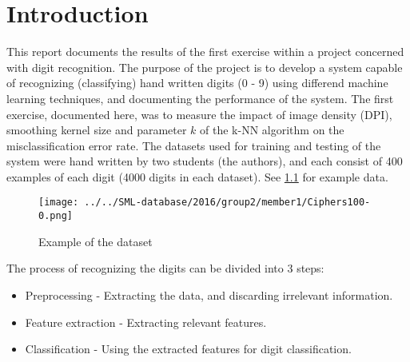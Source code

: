 \chapter{Introduction}
This report documents the results of the first exercise within
a project concerned with digit recognition.
The purpose of the project is to develop a system capable of recognizing
(classifying) hand written digits (0 - 9) using differend machine learning techniques,
and documenting the performance of the system.
The first exercise, documented here, was to measure the impact
of image density (DPI), smoothing kernel size and parameter \(k\)
of the k-NN algorithm on the misclassification error rate.
The datasets used for training and testing of the system
were hand written by two students (the authors), and each
consist of 400 examples of each digit (4000 digits in each dataset).
See \ref{fig:data} for example data.

\begin{figure}[H]
\centering
\texttt{[image: ../../SML-database/2016/group2/member1/Ciphers100-0.png]}
\caption{Example of the  dataset}
\label{fig:data}
\end{figure} 

The process of recognizing the digits can be divided into 3 steps:
\begin{itemize}
\item Preprocessing - Extracting the data, and discarding irrelevant information. 
\item Feature extraction - Extracting relevant features.
\item Classification - Using the extracted features for digit classification.
\end{itemize}